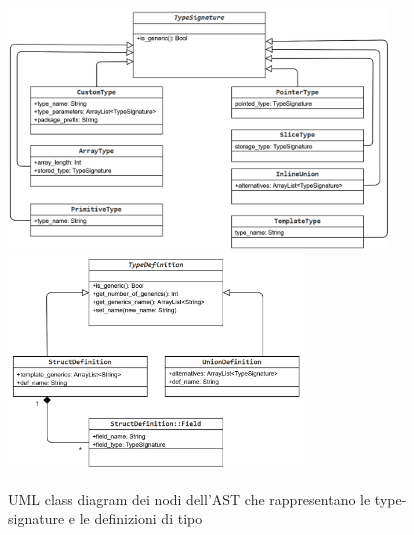 \begin{figure}[H]
    \centering
        \includegraphics[width=0.9\textwidth]{../../Assets/TypeSignatureAST.png}
        \vspace{0.5cm}
        \includegraphics[width=0.7\textwidth]{../../Assets/TypeDefAST.png}
    \caption{
        \centering
        UML class diagram dei nodi dell'AST che rappresentano le type-signature
        e le definizioni di tipo
    }
\end{figure}
